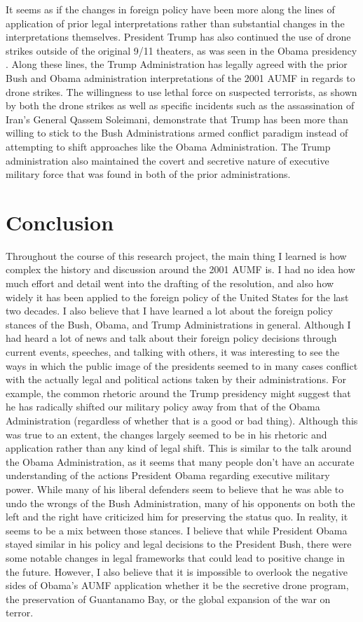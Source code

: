 \documentclass[12pt]{article}
\begin{document}
It seems as if the changes in foreign policy have been more along the lines of application of prior legal interpretations rather than substantial changes in the interpretations themselves.
President Trump has also continued the use of drone strikes outside of the original 9/11 theaters, as was seen in the Obama presidency \autocite[35]{sterio2018}.
Along these lines, the Trump Administration has legally agreed with the prior Bush and Obama administration interpretations of the 2001 AUMF in regards to drone strikes.
The willingness to use lethal force on suspected terrorists, as shown by both the drone strikes as well as specific incidents such as the assassination of Iran's General Qassem Soleimani, demonstrate that Trump has been more than willing to stick to the Bush Administrations armed conflict paradigm instead of attempting to shift approaches like the Obama Administration.
The Trump administration also maintained the covert and secretive nature of executive military force that was found in both of the prior administrations.

\section*{Conclusion}
Throughout the course of this research project, the main thing I learned is how complex the history and discussion around the 2001 AUMF is.
I had no idea how much effort and detail went into the drafting of the resolution, and also how widely it has been applied to the foreign policy of the United States for the last two decades.
I also believe that I have learned a lot about the foreign policy stances of the Bush, Obama, and Trump Administrations in general.
Although I had heard a lot of news and talk about their foreign policy decisions through current events, speeches, and talking with others, it was interesting to see the ways in which the public image of the presidents seemed to in many cases conflict with the actually legal and political actions taken by their administrations.
For example, the common rhetoric around the Trump presidency might suggest that he has radically shifted our military policy away from that of the Obama Administration (regardless of whether that is a good or bad thing).
Although this was true to an extent, the changes largely seemed to be in his rhetoric and application rather than any kind of legal shift.
This is similar to the talk around the Obama Administration, as it seems that many people don't have an accurate understanding of the actions President Obama regarding executive military power.
While many of his liberal defenders seem to believe that he was able to undo the wrongs of the Bush Administration, many of his opponents on both the left and the right have criticized him for preserving the status quo.
In reality, it seems to be a mix between those stances.
I believe that while President Obama stayed similar in his policy and legal decisions to the President Bush, there were some notable changes in legal frameworks that could lead to positive change in the future.
However, I also believe that it is impossible to overlook the negative sides of Obama's AUMF application whether it be the secretive drone program, the preservation of Guantanamo Bay, or the global expansion of the war on terror.
\end{document}

